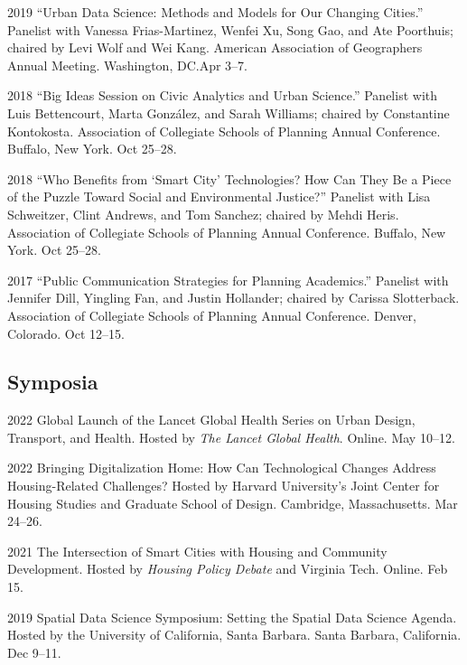 \documentclass[12pt,letterpaper]{report}
\begin{document}
\begin{tablist}
        \item[2019] \tab{}\enquote{Urban Data Science: Methods and Models for Our Changing Cities.} Panelist with Vanessa Frias-Martinez, Wenfei Xu, Song Gao, and Ate Poorthuis; chaired by Levi Wolf and Wei Kang. American Association of Geographers Annual Meeting. Washington, DC.\@ Apr 3--7.

        \item[2018] \tab{}\enquote{Big Ideas Session on Civic Analytics and Urban Science.} Panelist with Luis Bettencourt, Marta Gonz{\'a}lez, and Sarah Williams; chaired by Constantine Kontokosta. Association of Collegiate Schools of Planning Annual Conference. Buffalo, New York. Oct 25--28.

        \item[2018] \tab{}\enquote{Who Benefits from \enquote{Smart City} Technologies? How Can They Be a Piece of the Puzzle Toward Social and Environmental Justice?} Panelist with Lisa Schweitzer, Clint Andrews, and Tom Sanchez; chaired by Mehdi Heris. Association of Collegiate Schools of Planning Annual Conference. Buffalo, New York. Oct 25--28.

        \item[2017] \tab{}\enquote{Public Communication Strategies for Planning Academics.} Panelist with Jennifer Dill, Yingling Fan, and Justin Hollander; chaired by Carissa Slotterback. Association of Collegiate Schools of Planning Annual Conference. Denver, Colorado. Oct 12--15.

    \end{tablist}

    \subsection*{Symposia}

    \begin{tablist}
    	
    	\item[2022] \tab{}Global Launch of the Lancet Global Health Series on Urban Design, Transport, and Health. Hosted by \textit{The Lancet Global Health}. Online. May 10--12.

        \item[2022] \tab{}Bringing Digitalization Home: How Can Technological Changes Address Housing-Related Challenges? Hosted by Harvard University's Joint Center for Housing Studies and Graduate School of Design. Cambridge, Massachusetts. Mar 24--26.

        \item[2021] \tab{}The Intersection of Smart Cities with Housing and Community Development. Hosted by \textit{Housing Policy Debate} and Virginia Tech. Online. Feb 15.

        \item[2019] \tab{}Spatial Data Science Symposium: Setting the Spatial Data Science Agenda. Hosted by the University of California, Santa Barbara. Santa Barbara, California. Dec 9--11.

    \end{tablist}
\end{document}
